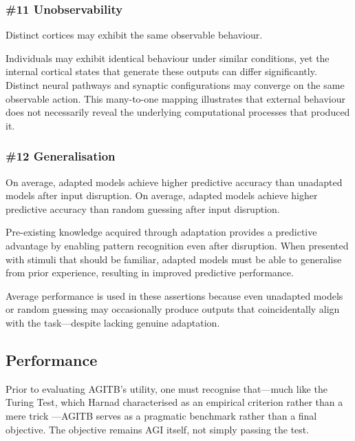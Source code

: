 \documentclass{article}
\newenvironment{one_assertion}[1]
{
  \begin{tabular}{p{1.5cm}p{8.2cm}}
    \textbf{Assertion:} & #1 \\
}{
  \end{tabular}\\
}
\newenvironment{two_assertions}[2]
{
  \begin{tabular}{p{1.5cm}p{8.2cm}}
    \textbf{Assertion:} & #1 \\
    \textbf{Assertion:} & #2 \\
}{
  \end{tabular}\\
}
\begin{document}
\subsubsection*{\#11 Unobservability}
\begin{one_assertion}
    {Distinct cortices may exhibit the same observable behaviour.}
\end{one_assertion}

Individuals may exhibit identical behaviour under similar conditions, yet the internal cortical states that generate these outputs can differ significantly. Distinct neural pathways and synaptic configurations may converge on the same observable action. This many-to-one mapping illustrates that external behaviour does not necessarily reveal the underlying computational processes that produced it.

\subsubsection*{\#12 Generalisation}
\begin{two_assertions}
    {On average, adapted models achieve higher predictive accuracy than unadapted models after input disruption.}
    {On average, adapted models achieve higher predictive accuracy than random guessing after input disruption.}
\end{two_assertions}

Pre-existing knowledge acquired through adaptation provides a predictive advantage by enabling pattern recognition even after disruption. When presented with stimuli that should be familiar, adapted models must be able to generalise from prior experience, resulting in improved predictive performance.

Average performance is used in these assertions because even unadapted models or random guessing may occasionally produce outputs that coincidentally align with the task—despite lacking genuine adaptation.

\subsection{Performance}

Prior to evaluating AGITB’s utility, one must recognise that—much like the Turing Test, which Harnad characterised as an empirical criterion rather than a mere trick \cite{Harnad1992}—AGITB serves as a pragmatic benchmark rather than a final objective. The objective remains AGI itself, not simply passing the test.
\end{document}
